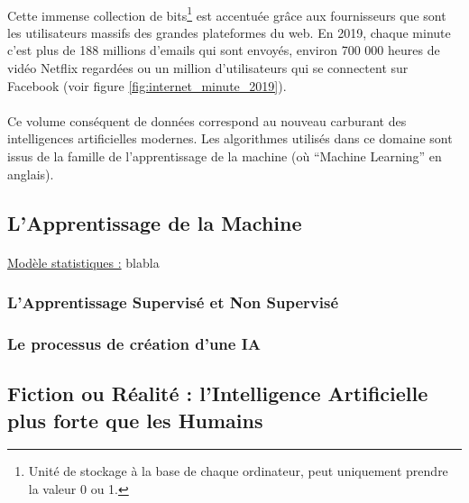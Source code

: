 \documentclass[10pt, french, a4paper]{report}
\begin{document}
\paragraph{}
Cette immense collection de bits\footnote{Unité de stockage à la base de chaque ordinateur, peut uniquement prendre la valeur 0 ou 1.} est accentuée grâce aux fournisseurs que sont les utilisateurs massifs des grandes plateformes du web. En 2019, chaque minute c'est plus de 188 millions d'emails qui sont envoyés, environ 700 000 heures de vidéo Netflix regardées ou un million d'utilisateurs qui se connectent sur Facebook (voir figure \ref{fig:internet_minute_2019}).


\paragraph{}
Ce volume conséquent de données correspond au nouveau carburant des intelligences artificielles modernes. Les algorithmes utilisés dans ce domaine sont issus de la famille de l'apprentissage de la machine (où ``Machine Learning'' en anglais).

\subsection{L'Apprentissage de la Machine}

\paragraph{}
\underline{Modèle statistiques :} blabla

\subsubsection{L'Apprentissage Supervisé et Non Supervisé}

\paragraph{}

\subsubsection{Le processus de création d'une IA}

\paragraph{}

\subsection{Fiction ou Réalité : l'Intelligence Artificielle plus forte que les Humains}
\end{document}
